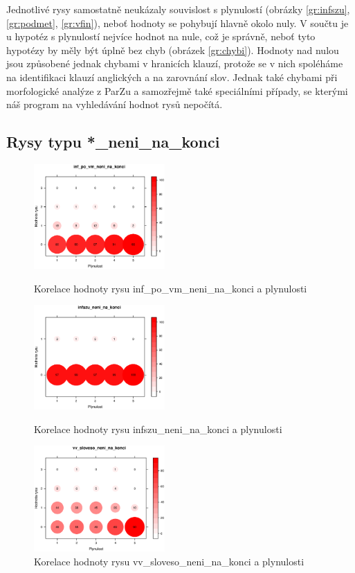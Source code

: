 \documentclass[12pt,a4paper]{report}
\begin{document}
Jednotlivé rysy samostatně neukázaly souvislost s plynulostí (obrázky \ref{gr:infszu}, \ref{gr:podmet}, \ref{gr:vfin}), neboť hodnoty se pohybují hlavně okolo nuly. V součtu je u hypotéz s plynulostí nejvíce hodnot na nule, což je správně, neboť tyto hypotézy by měly být úplně bez chyb (obrázek \ref{gr:chybi}). Hodnoty nad nulou jsou způsobené jednak chybami v hranicích klauzí, protože se v nich spoléháme na identifikaci klauzí anglických a na zarovnání slov. Jednak také chybami při morfologické analýze z ParZu a samozřejmě také speciálními případy, se kterými náš program na vyhledávání hodnot rysů nepočítá.

\pagebreak


\subsection{Rysy typu *\_neni\_na\_konci}
\begin{figure}[!htb]
  \centering\includegraphics[width=50mm]{./grafy/rysy/inf_po_vm_neni_na_konci-c.eps}
  \caption{Korelace hodnoty rysu inf\_po\_vm\_neni\_na\_konci a plynulosti}\label{gr:vm}
\endminipage\hfill
{}
  \centering\includegraphics[width=50mm]{./grafy/rysy/infszu_neni_na_konci-c.eps}
  \caption{Korelace hodnoty rysu infszu\_neni\_na\_konci a plynulosti}\label{gr:infszu_konec}
\endminipage\hfill
{}
  \centering\includegraphics[width=50mm]{./grafy/rysy/vv_sloveso_neni_na_konci-c.eps}
  \caption{Korelace hodnoty rysu vv\_sloveso\_neni\_na\_konci a plynulosti}\label{gr:vvsloveso}
\endminipage\hfill
\end{figure}
\end{document}
